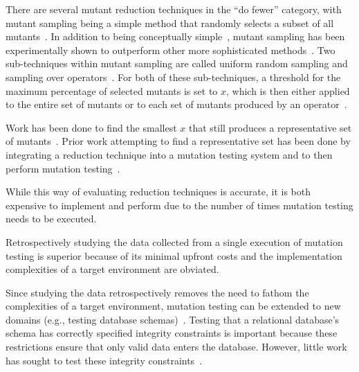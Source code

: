 

There are several mutant reduction techniques in the ``do fewer'' category, with mutant sampling being a simple method
that randomly selects a subset of all mutants~\cite{wong1995reducing}. In addition to being conceptually
simple~\cite{gopinath2015mutation}, mutant sampling has been experimentally shown to outperform other more sophisticated
methods~\cite{zhang2010operator}.  Two sub-techniques within mutant sampling are called uniform random sampling and
sampling over operators~\cite{gopinath2015mutation, gopinath2015empirical}.  For both of these sub-techniques, a
threshold for the maximum percentage of selected mutants is set to $x$, which is then either applied to the entire set
of mutants or to each set of mutants produced by an operator~\cite{gopinath2015mutation, gopinath2015empirical}.

Work has been done to find the smallest $x$ that still produces a representative set of mutants~\cite{jia2011analysis,
mathur1994empirical}. Prior work attempting to find a representative set has been done by integrating a reduction
technique into a mutation testing system and to then perform mutation testing~\cite{demillo1988extended,
king1991fortran}.

While this way of evaluating reduction techniques is accurate, it is both
expensive to implement and perform due to the number of times mutation testing
needs to be executed.


Retrospectively studying the data
collected from a single execution of mutation testing is superior
because of its minimal upfront costs and the implementation complexities of
a target environment are obviated.

Since studying the data retrospectively removes the need to fathom the complexities of a target environment,
mutation testing can be extended to new domains (e.g., testing database schemas)~\cite{mcminn2016virtual, mcminn2015effectiveness, wright2013efficient}.
Testing that a relational database's schema has correctly specified integrity constraints is important
because these restrictions ensure that only valid data enters the database. However, little work has
sought to test these integrity constraints~\cite{mcminn2016virtual}.


